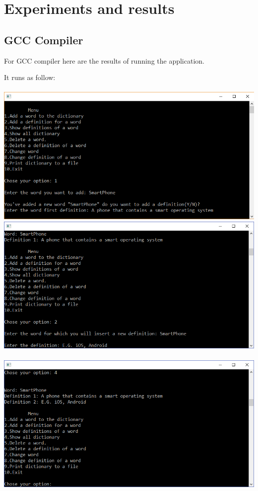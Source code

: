\documentclass{article}
\begin{document}
\section{Experiments and results}
\subsection{GCC Compiler}
\textbf{}
\indent For GCC compiler here are the results of running the application.

It runs as follow: \\ \\
\includegraphics[scale=1]{e1} \\
\includegraphics[scale=1]{e2} \\ \\
\includegraphics[scale=1]{e3} \\
\end{document}

